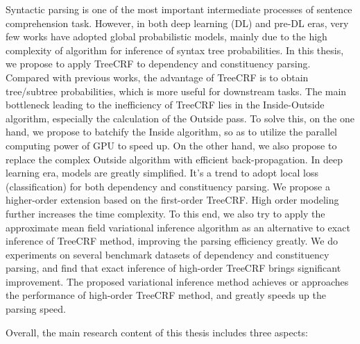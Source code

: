 
\begin{eabstract}
  Syntactic parsing is one of the most important intermediate processes of sentence comprehension task.
  However, in both deep learning (DL) and pre-DL eras, very few works have adopted global probabilistic models, mainly due to the high complexity of algorithm for inference of syntax tree probabilities.
  In this thesis, we propose to apply TreeCRF to dependency and constituency parsing.
  Compared with previous works, the advantage of TreeCRF is to obtain tree/subtree probabilities, which is more useful for downstream tasks.
  The main bottleneck leading to the inefficiency of TreeCRF lies in the Inside-Outside algorithm, especially the calculation of the Outside pass.
  To solve this, on the one hand, we propose to batchify the Inside algorithm, so as to utilize the parallel computing power of GPU to speed up.
  On the other hand, we also propose to replace the complex Outside algorithm with efficient back-propagation.
  In deep learning era, models are greatly simplified. It's a trend to adopt local loss (classification) for both dependency and constituency parsing.
  We propose a higher-order extension based on the first-order TreeCRF.
  High order modeling further increases the time complexity.
  To this end, we also try to apply the approximate mean field variational inference algorithm as an alternative to exact inference of TreeCRF method, improving the parsing efficiency greatly.
  We do experiments on several benchmark datasets of dependency and constituency parsing, and find that exact inference of high-order TreeCRF brings significant improvement.
  The proposed variational inference method achieves or approaches the performance of high-order TreeCRF method, and greatly speeds up the parsing speed.

  Overall, the main research content of this thesis includes three aspects:


\end{eabstract}
